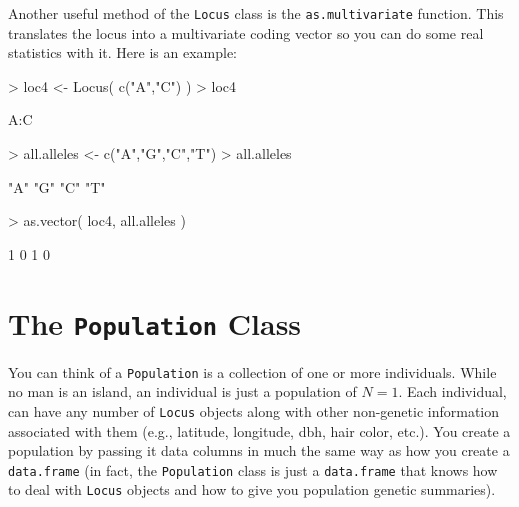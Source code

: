 \documentclass[letterpaper,twoside,openany]{book}
\begin{document}
Another useful method of the \texttt{Locus} class is the  \texttt{as.multivariate} function.  This translates the locus into a multivariate coding vector so you can do some real statistics with it.  Here is an example:


\begin{Schunk}
\begin{Sinput}
> loc4 <- Locus( c("A","C") )
> loc4
\end{Sinput}
\begin{Soutput}
A:C 
\end{Soutput}
\begin{Sinput}
> all.alleles <- c("A","G","C","T")
> all.alleles
\end{Sinput}
\begin{Soutput}
[1] "A" "G" "C" "T"
\end{Soutput}
\begin{Sinput}
> as.vector( loc4, all.alleles )
\end{Sinput}
\begin{Soutput}
[1] 1 0 1 0
\end{Soutput}
\end{Schunk}





%
%
\section{The \texttt{Population} Class}

You can think of a \texttt{Population} is a collection of one or more individuals.  While no man is an island, an individual is just a population of $N=1$.  Each individual, can have any number of \texttt{Locus} objects along with other non-genetic information associated with them (e.g., latitude, longitude, dbh, hair color, etc.).  You create a population by passing it data columns in much the same way as how you create a \texttt{data.frame} (in fact, the \texttt{Population} class is just a \texttt{data.frame} that knows how to deal with \texttt{Locus} objects and how to give you population genetic summaries).
\end{document}
